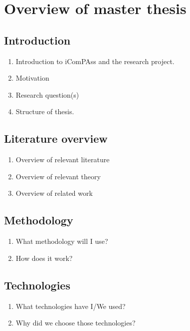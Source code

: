\documentclass[../Main/thesis.tex]{subfiles}
\begin{document}
\chapter*{Overview of master thesis}

\section*{Introduction}
\begin{enumerate}
	\item Introduction to iComPAss and the research project.
	\item Motivation
	\item Research question(s)
	\item Structure of thesis.
\end{enumerate}

\section*{Literature overview}
\begin{enumerate}
	\item Overview of relevant literature
	\item Overview of relevant theory
	\item Overview of related work
\end{enumerate}

\section*{Methodology}
\begin{enumerate}
	\item What methodology will I use?
	\item How does it work?
\end{enumerate}

\section*{Technologies}
\begin{enumerate}
	\item What technologies have I/We used?
	\item Why did we choose those technologies?
\end{enumerate}
	
\end{document}
